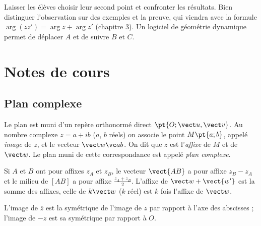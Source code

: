 \begin{teachernote}
Laisser les élèves choisir leur second point et confronter les résultats. Bien distinguer l'observation sur des exemples et la preuve, qui viendra avec la formule $\arg(zz')=\arg z+\arg z'$ (chapitre 3). Un logiciel de géométrie dynamique permet de déplacer $A$ et de suivre $B$ et $C$.
\end{teachernote}

\mxnewpage
\section{Notes de cours}
\subsection{Plan complexe}
\begin{definition}
Le plan est muni d'un repère orthonormé direct $\pt{O;\vect u,\vect v}$. Au nombre complexe $z=a+ib$ ($a$, $b$ réels) on associe le point $M\pt{a;b}$, appelé \emph{image} de $z$, et le vecteur $\vect w\vc ab$. On dit que $z$ est l'\emph{affixe} de $M$ et de $\vect w$. Le plan muni de cette correspondance est appelé \emph{plan complexe}.
\end{definition}
\begin{theorem}
Si $A$ et $B$ ont pour affixes $z_A$ et $z_B$, le vecteur $\vect{AB}$ a pour affixe $z_B-z_A$ et le milieu de $[AB]$ a pour affixe $\frac{z_A+z_B}2$. L'affixe de $\vect w+\vect{w'}$ est la somme des affixes, celle de $k\vect w$ ($k$ réel) est $k$ fois l'affixe de $\vect w$.\par
L'image de $\overline z$ est la symétrique de l'image de $z$ par rapport à l'axe des abscisses ; l'image de $-z$ est sa symétrique par rapport à $O$.
\end{theorem}


